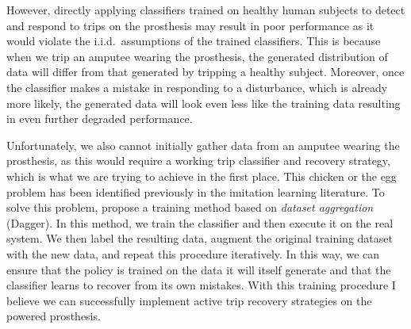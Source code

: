 However, directly applying classifiers trained on healthy human subjects to
detect and respond to trips on the prosthesis may result in poor performance as
it would violate the i.i.d.\ assumptions of the trained classifiers.  This is
because when we trip an amputee wearing the prosthesis, the generated
distribution of data will differ from that generated by tripping a healthy
subject. Moreover, once the classifier makes a mistake in responding to a
disturbance, which is already more likely, the generated data will look even
less like the training data resulting in even further degraded performance. 

Unfortunately, we also cannot initially gather data from an amputee wearing the
prosthesis, as this would require a working trip classifier and recovery
strategy, which is what we are trying to achieve in the first place. This
chicken or the egg problem has been identified previously in the imitation
learning literature. To solve this problem, \citet{ross2011reduction} propose a
training method based on \emph{dataset aggregation} (Dagger). In this method, we
train the classifier and then execute it on the real system. We then label the
resulting data, augment the original training dataset with the new data, and
repeat this procedure iteratively. In this way, we can ensure that the policy is
trained on the data it will itself generate and that the classifier learns to
recover from its own mistakes. With this training procedure I believe we can
successfully implement active trip recovery strategies on the powered
prosthesis.

